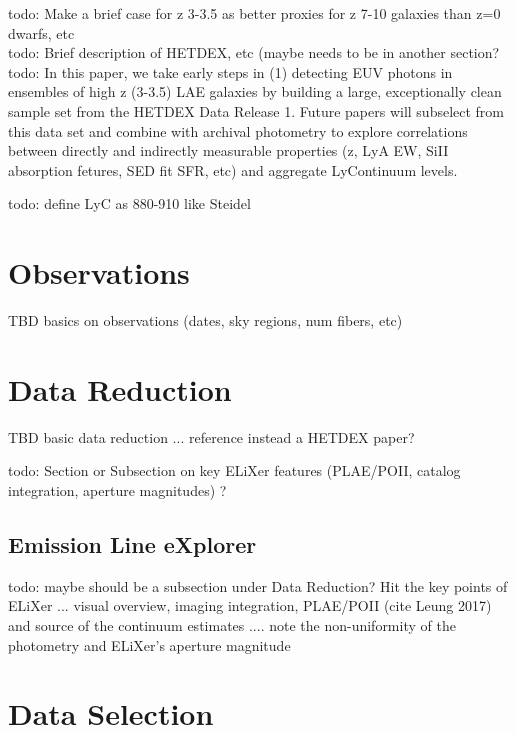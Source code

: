 \documentclass{aastex62}
\begin{document}
{ \color{red} todo: Make a brief case for z 3-3.5 as better proxies for z 7-10 galaxies than z=0 dwarfs, etc}\\

{ \color{red} todo: Brief description of HETDEX, etc (maybe needs to be in another section?}\\

{ \color{red} todo:  In this paper, we take early steps in (1) detecting EUV photons in ensembles of high z (3-3.5) LAE galaxies by building a large, exceptionally clean sample set from the HETDEX Data Release 1. Future papers will subselect from this data set and combine with archival photometry to explore correlations between directly and indirectly measurable properties (z, LyA EW, SiII absorption fetures, SED fit SFR, etc) and aggregate LyContinuum levels.}

{ \color{red} todo: define LyC as 880-910 like Steidel}

\section{Observations} \label{sec:obs}

TBD basics on observations (dates, sky regions, num fibers, etc)

\section{Data Reduction} \label{sec:reduction}

TBD basic data reduction ... reference instead a HETDEX paper?

{ \color{red} todo: Section or Subsection on key ELiXer features (PLAE/POII, catalog integration, aperture magnitudes) ?}

\subsection{Emission Line eXplorer} \label{sec:elixer}
{ \color{red} todo: maybe should be a subsection under Data Reduction? Hit the key points of ELiXer ... visual overview, imaging integration, PLAE/POII (cite Leung 2017) and source of the continuum estimates .... note the non-uniformity of the photometry and ELiXer's aperture magnitude }


\section{Data Selection} \label{sec:selection}
\end{document}
